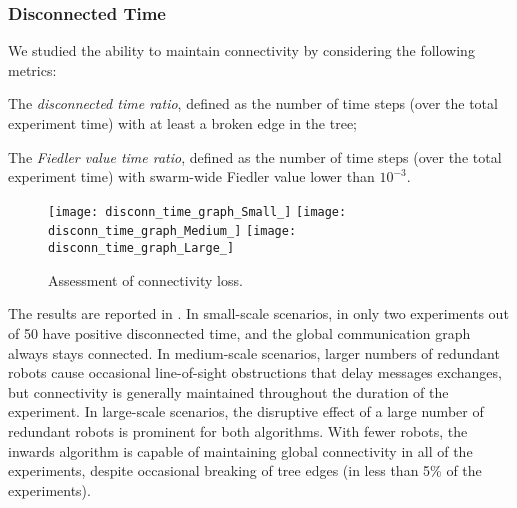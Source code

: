 \subsubsection{Disconnected Time}
We studied the ability to maintain connectivity by considering the
following metrics:
\begin{inparaenum}[(i)]
\item The \emph{disconnected time ratio}, defined as the number of
  time steps (over the total experiment time) with at least a broken
  edge in the tree;
\item The \emph{Fiedler value time ratio}, defined as the number of
  time steps (over the total experiment time) with swarm-wide Fiedler
  value lower than $10^{-3}$.
\end{inparaenum}
\begin{figure*}[t]
  \centering
  \texttt{[image: disconn\_time\_graph\_Small\_]}
  \texttt{[image: disconn\_time\_graph\_Medium\_]}
  \texttt{[image: disconn\_time\_graph\_Large\_]}
  \caption{Assessment of connectivity loss.}
  \label{fig:disc_time}
\end{figure*}
The results are reported in . In small-scale scenarios,
in only two experiments out of 50 have positive disconnected time, and
the global communication graph always stays connected. In medium-scale
scenarios, larger numbers of redundant robots cause occasional
line-of-sight obstructions that delay messages exchanges, but
connectivity is generally maintained throughout the duration of the
experiment. In large-scale scenarios, the disruptive effect of a large
number of redundant robots is prominent for both algorithms. With
fewer robots, the inwards algorithm is capable of maintaining global
connectivity in all of the experiments, despite occasional breaking of
tree edges (in less than 5\% of the experiments).





